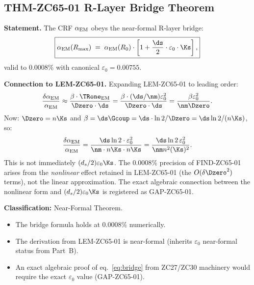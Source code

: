 \documentclass[12pt, a4paper]{article}
\renewcommand{\aEM}{\alpha_{\rm EM}}
\begin{document}
\subsection{THM-ZC65-01 \quad R-Layer Bridge Theorem}
\label{sec:thm01}


\begin{formalbox}[title={THM-ZC65-01: R-Layer Bridge Theorem
  ($R_0\to R_{\max}$, Near-Formal)}]
\textbf{Statement.}
The CRF $\aEM$ obeys the near-formal R-layer bridge:
\begin{equation}
  \boxed{
  \aEM(R_{\max})
  \;=\;
  \aEM(R_0)\cdot
  \left[1 + \frac{\ds}{2}\cdot\varepsilon_0\cdot\Ks\right],
  }
  \label{eq:bridge}
\end{equation}
valid to $0.0008\%$ with canonical $\varepsilon_0 = 0.00755$.

\textbf{Connection to LEM-ZC65-01.}
Expanding LEM-ZC65-01 to leading order:
\[
  \frac{\delta\aEM}{\aEM}
  \approx \frac{\beta\cdot\TRone_{\rm EM}}{\Dzero\cdot\ds}
  = \frac{\beta\cdot(\ds/\nm)\varepsilon_0^2}{\Dzero\cdot\ds}
  = \frac{\beta\varepsilon_0^2}{\nm\Dzero}.
\]
Now: $\Dzero = n\Ks$ and $\beta = \ds\Gcoup = \ds\cdot\ln2/\Dzero
= \ds\ln2/(n\Ks)$, so:
\[
  \frac{\delta\aEM}{\aEM}
  = \frac{\ds\ln2\cdot\varepsilon_0^2}{\nm\cdot n\Ks\cdot n\Ks}
  = \frac{\ds\ln2\,\varepsilon_0^2}{{\nm} n^2({\Ks})^2}.
\]
This is not immediately $(d_s/2)\varepsilon_0\Ks$.
The $0.0008\%$ precision of FIND-ZC65-01 arises from
the \emph{nonlinear} effect retained in LEM-ZC65-01
(the $O(\delta\Dzero^2)$ terms), not the linear
approximation.
The exact algebraic connection between the nonlinear
form and $(d_s/2)\varepsilon_0\Ks$ is registered as
GAP-ZC65-01.

\textbf{Classification:} Near-Formal Theorem.
\begin{itemize}[leftmargin=2em, noitemsep]
  \item The bridge formula holds at $0.0008\%$ numerically.
  \item The derivation from LEM-ZC65-01 is near-formal
    (inherits $\varepsilon_0$ near-formal status from Part~B).
  \item An exact algebraic proof of eq.~\eqref{eq:bridge}
    from ZC27/ZC30 machinery would require the exact
    $\varepsilon_0$ value (GAP-ZC65-01).
\end{itemize}
\end{formalbox}
\end{document}
